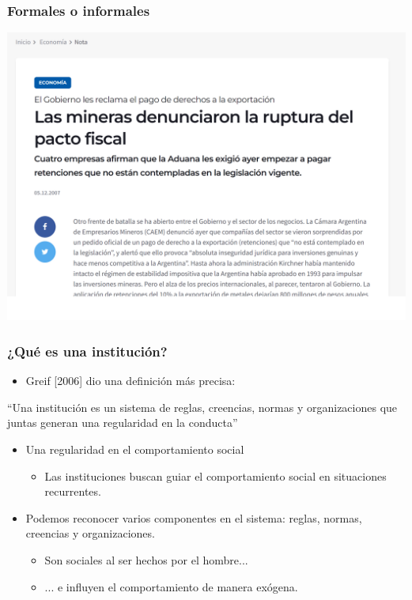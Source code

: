 \documentclass{beamer}
\begin{document}
\begin{frame}
\frametitle{Formales o informales}
\centering
\includegraphics[scale=0.4]{Slides Principios de Economia/Figures/Mina2.png}
\end{frame}


\begin{frame}
\frametitle{¿Qué es una institución?}
\begin{itemize}
    \item Greif [2006] dio una definición más precisa:
    \end{itemize}
     \begin{boxB}
     ``Una institución es un sistema de reglas, creencias, normas y organizaciones que juntas generan una regularidad en la conducta''
     \end{boxB}
\vspace{2mm}
\begin{itemize}
    \item Una regularidad en el comportamiento social 
    \begin{itemize}
        \item Las instituciones buscan guiar el comportamiento social en situaciones recurrentes. \vspace{2mm}
    \end{itemize}
    \item Podemos reconocer varios componentes en el sistema: reglas, normas, creencias y organizaciones. 
    \begin{itemize}
        \item Son sociales al ser hechos por el hombre...
        \item ... e influyen el comportamiento de manera exógena.
    \end{itemize}
\end{itemize} 
\end{frame}
\end{document}
